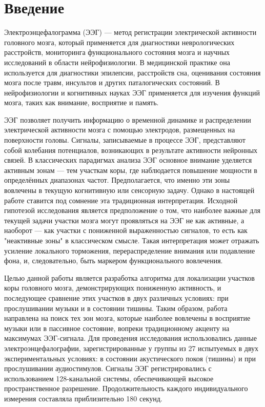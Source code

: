 \chapter*{Введение}
\label{ch:intro}
Электроэнцефалограмма (ЭЭГ) — метод регистрации электрической активности головного мозга, который применяется для диагностики неврологических расстройств, мониторинга функционального состояния мозга и научных исследований в области нейрофизиологии. В медицинской практике она используется для диагностики эпилепсии, расстройств сна, оценивания состояния мозга после травм, инсультов и других паталогических состояний. В нейрофизиологии и когнитивных науках ЭЭГ применяется для изучения функций мозга, таких как внимание, восприятие и память.

ЭЭГ позволяет получить информацию о временной динамике и распределении электрической активности мозга с помощью электродов, размещенных на поверхности головы. Сигналы, записываемые в процессе ЭЭГ, представляют собой колебания потенциалов, возникающих в результате активности нейронных связей. В классических парадигмах анализа ЭЭГ основное внимание уделяется активным зонам — тем участкам коры, где наблюдается повышение мощности в определённых диапазонах частот. Предполагается, что именно эти зоны вовлечены в текущую когнитивную или сенсорную задачу. Однако в настоящей работе ставится под сомнение эта традиционная интерпретация. Исходной гипотезой исследования является предположение о том, что наиболее важные для текущей задачи участки мозга могут проявляться на ЭЭГ не как активные, а наоборот — как участки с пониженной выраженностью сигналов, то есть как "неактивные зоны" в классическом смысле. Такая интерпретация может отражать усиление локального торможения, перераспределение внимания или подавление фона, и, следовательно, быть маркером функционального вовлечения.

Целью данной работы является разработка алгоритма для локализации участков коры головного мозга, демонстрирующих пониженную активность, и последующее сравнение этих участков в двух различных условиях: при прослушивании музыки и в состоянии тишины. Таким образом, работа направлена на поиск тех зон мозга, которые наиболее вовлечены в восприятие музыки или в пассивное состояние, вопреки традиционному акценту на максимумах ЭЭГ-сигнала.
Для проведения исследования использовались данные электроэнцефалографии, зарегистрированные у группы из 27 испытуемых в двух экспериментальных условиях: в состоянии акустического покоя (тишины) и при прослушивании аудиостимулов. Сигналы ЭЭГ регистрировались с использованием 128-канальной системы, обеспечивающей высокое пространственное разрешение. Продолжительность каждого индивидуального измерения составляла приблизительно 180 секунд.


